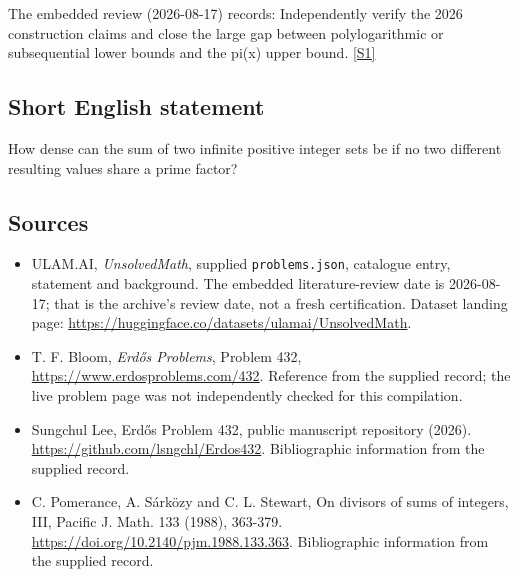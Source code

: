 \documentclass[11pt,a4paper]{article}
\newcommand{\sref}[2]{\hyperlink{source:#1:#2}{[S#2]}}
\begin{document}
The embedded review (2026-08-17) records: Independently verify the 2026 construction claims and close the large gap between polylogarithmic or subsequential lower bounds and the pi(x) upper bound. \sref{statement}{1}

\subsection{Short English statement}

How dense can the sum of two infinite positive integer sets be if no two different resulting values share a prime factor?

\subsection{Sources}

{\small

\begin{itemize}

\item[\hypertarget{source:statement:1}{S1}] ULAM.AI, \emph{UnsolvedMath}, supplied \texttt{problems.json}, catalogue entry, statement and background. The embedded literature-review date is 2026-08-17; that is the archive’s review date, not a fresh certification. Dataset landing page: \url{https://huggingface.co/datasets/ulamai/UnsolvedMath}.

\item[\hypertarget{source:statement:2}{S2}] T. F. Bloom, \emph{Erdős Problems}, Problem 432, \url{https://www.erdosproblems.com/432}. Reference from the supplied record; the live problem page was not independently checked for this compilation.

\item[\hypertarget{source:statement:3}{S3}] Sungchul Lee, Erdős Problem 432, public manuscript repository (2026). \url{https://github.com/lsngchl/Erdos432}. Bibliographic information from the supplied record.

\item[\hypertarget{source:statement:4}{S4}] C. Pomerance, A. Sárközy and C. L. Stewart, On divisors of sums of integers, III, Pacific J. Math. 133 (1988), 363-379. \url{https://doi.org/10.2140/pjm.1988.133.363}. Bibliographic information from the supplied record.

\end{itemize}

}

\label{end:statement}
\end{document}
